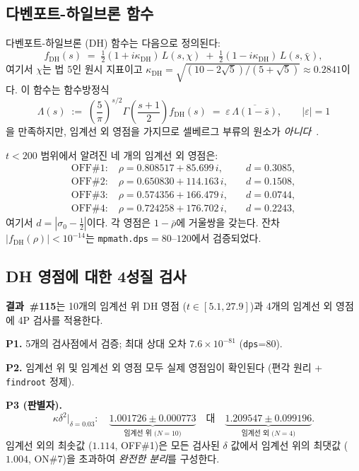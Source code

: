 \documentclass[11pt, a4paper]{article}
\theoremstyle{plain}
\theoremstyle{definition}
\newcommand{\DHf}{\mathrm{DH}}         %
\begin{document}
\subsection{다벤포트-하일브론 함수}
\label{ssec:dhdef}

다벤포트-하일브론 (DH) 함수는 다음으로 정의된다:
\[
  f_{\DHf}(s) \;=\; \tfrac{1}{2}(1+i\kappa_{\DHf})\,L(s,\chi)
              \;+\; \tfrac{1}{2}(1-i\kappa_{\DHf})\,L(s,\bar{\chi}),
\]
여기서 $\chi$는 법 5인 원시 지표이고
$\kappa_{\DHf} = \sqrt{(10-2\sqrt{5})/(5+\sqrt{5})} \approx 0.2841$이다.
이 함수는 함수방정식
\[
  \Lambda(s) \;:=\; \left(\frac{5}{\pi}\right)^{s/2}\Gamma\!\left(\frac{s+1}{2}\right)f_{\DHf}(s)
  \;=\; \varepsilon\,\overline{\Lambda(1-\bar{s})},
  \qquad |\varepsilon|=1
\]
을 만족하지만, 임계선 외 영점을 가지므로
셀베르그 부류의 원소가 \emph{아니다}~\cite{titchmarsh1986}.

$t<200$ 범위에서 알려진 네 개의 임계선 외 영점은:
\begin{equation}
  \label{eq:dhzeros}
  \begin{aligned}
    \text{OFF\#1}: &\;\rho=0.808517+85.699\,i, &\quad d=0.3085,\\
    \text{OFF\#2}: &\;\rho=0.650830+114.163\,i, &\quad d=0.1508,\\
    \text{OFF\#3}: &\;\rho=0.574356+166.479\,i, &\quad d=0.0744,\\
    \text{OFF\#4}: &\;\rho=0.724258+176.702\,i, &\quad d=0.2243,
  \end{aligned}
\end{equation}
여기서 $d=|\sigma_{0}-\tfrac{1}{2}|$이다. 각 영점은
$1-\bar{\rho}$에 거울쌍을 갖는다.
잔차 $|f_{\DHf}(\rho)|<10^{-14}$는
\texttt{mpmath.dps}$=80$--$120$에서 검증되었다.


\subsection{DH 영점에 대한 4성질 검사}
\label{ssec:dhtest}

\textbf{결과~\#115}는 10개의 임계선 위 DH 영점
($t\in[5.1, 27.9]$)과 4개의 임계선 외 영점에 4P 검사를 적용한다.

\medskip
\noindent\textbf{P1.} 5개의 검사점에서 검증;
최대 상대 오차 $7.6\times10^{-81}$ (\texttt{dps}=80).

\medskip
\noindent\textbf{P2.} 임계선 위 및 임계선 외 영점 모두
실제 영점임이 확인된다
(편각 원리 + \texttt{findroot} 정제).

\medskip
\noindent\textbf{P3 (판별자).}
\begin{equation}
  \label{eq:p3disc}
  \kappa\delta^{2}\big|_{\delta=0.03}:
  \quad
  \underbrace{1.001726\pm 0.000773}_{\text{임계선 위 (}N=10\text{)}}
  \quad\text{대}\quad
  \underbrace{1.209547\pm 0.099196}_{\text{임계선 외 (}N=4\text{)}}.
\end{equation}
임계선 외의 최솟값 ($1.114$, OFF\#1)은
모든 검사된 $\delta$ 값에서 임계선 위의 최댓값 ($1.004$, ON\#7)을
초과하여 \emph{완전한 분리}를 구성한다.
\end{document}
